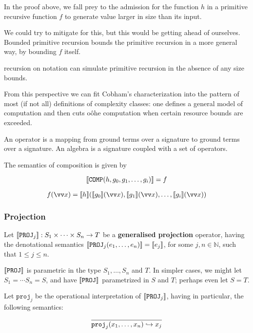 In the proof above, we fall prey to the admission for the function $h$ in a
primitive recursive function $f$ to generate value larger in size than its
input.

We could try to mitigate for this, but this would be getting ahead of
ourselves. Bounded primitive recursion bounds the primitive recursion in a more
general way, by bounding $f$ itself.

recursion on notation can simulate primitive recursion in the absence of any
size bounds\cite{bellantoni-phd-1992}.

From this perspective we can fit Cobham's characterization into the pattern of
most (if not all) definitions of complexity classes: one defines a general
model of computation and then cuts oôhe computation when certain resource
bounds are exceeded.

An operator is a mapping from ground terms over a signature to ground terms
over a signature. An algebra is a signature coupled with a set of operators.

The semantics of composition is given by

$${\mathopen{}\left\llbracket{\mathtt{COMP}{\ensuremath{\mathopen{}\left({h,g_0,g_1,\ldots,g_i}\right)\mathclose{}}}}\right\rrbracket\mathclose{}} = f$$

\begin{align*}
%
f\p{\vect{x}} = \sem{h}\p{\sem{g_0}\p{\vect{x}}, \sem{g_1}\p{\vect{x}}, \ldots,
\sem{g_i}\p{\vect{x}}}
%
\end{align*}

\subsubsection{Projection}

\label{sec:generalised-projection}

\begin{definition} Let ${\mathopen{}\left\llbracket{\mathtt{PROJ}_j}\right\rrbracket\mathclose{}} : S_1 \times \cdots \times S_n
\rightarrow T$ be a \textbf{generalised projection} operator, having the
denotational semantics ${\mathopen{}\left\llbracket{\mathtt{PROJ}_j{\ensuremath{\mathopen{}\left({e_1,\ldots,e_n}\right)\mathclose{}}}}\right\rrbracket\mathclose{}} = {\mathopen{}\left\llbracket{e_j}\right\rrbracket\mathclose{}}$,
for some $j,n \in \mathbb{N}$, such that $1 \leq j \leq n$.  \end{definition}

\begin{remark} ${\mathopen{}\left\llbracket{\mathtt{PROJ}}\right\rrbracket\mathclose{}}$ is parametric in the type $S_1,\ldots,S_n$
and $T$. In simpler cases, we might let $S_1 = \cdots S_n = S$, and have
${\mathopen{}\left\llbracket{\mathtt{PROJ}}\right\rrbracket\mathclose{}}$ parametrized in $S$ and $T$; perhaps even let $S = T$.
\end{remark}

\begin{definition} Let $\mathtt{proj}_j$ be the operational interpretation of
${\mathopen{}\left\llbracket{\mathtt{PROJ}_j}\right\rrbracket\mathclose{}}$, having in particular, the following
semantics:\begin{align*}
%
\axiom{ \mathtt{proj}_j\p{x_1,\ldots,x_{n}} \goesto x_j }
%
\end{align*}

\end{definition}

